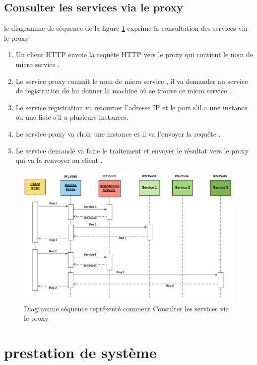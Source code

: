   \subsection{Consulter les services via le proxy }
    le diagramme de séquence de la figure \ref{fig:secance}   exprime  la  consultation des services via le proxy 
    \begin{enumerate}
    	
    	\item Un client HTTP envoie la requête HTTP vers le proxy qui contient le nom de micro service  .
    	
    	\item  Le service proxy connait le nom de micro service , il va demander au service  de registration de lui donner la machine où se trouve ce micro service .
    	
    	\item Le service registration  va retourner l'adresse IP et le port s'il a une instance ou une liste s'il a  plusieurs instances.
    	
    	\item  Le service proxy va choir une instance et il va l'envoyer la requête  .
    	
    	\item  Le service demandé va faire le traitement et envoyer le résultat vers le proxy qui va la renvoyer au client .
    \end{enumerate}
    
    
\begin{figure}[H]
	\centering
	\includegraphics[width=0.7\linewidth]{images/secance}
	\caption{Diagramme séquence représenté comment  Consulter les services via le proxy}
	\label{fig:secance}
\end{figure}

 
 
 
 
 
 \section{prestation de système }
 
